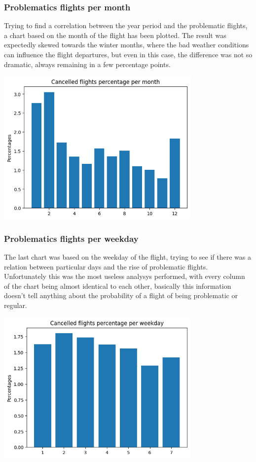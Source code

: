 \documentclass[
	letterpaper, %
	10pt, %
]{class}
\begin{document}
\subsubsection{Problematics flights per month}
Trying to find a correlation between the year period and the problematic flights, a chart based on the month of the flight has been plotted. The result was expectedly skewed towards the winter months, where the bad weather conditions can influence the flight departures, but even in this case, the difference was not so dramatic, always remaining in a few percentage points.

\begin{center}
    \includegraphics[width=10cm]{../images/cancelled_per_month.png}
\end{center}

\subsubsection{Problematics flights per weekday}

The last chart was based on the weekday of the flight, trying to see if there was a relation between particular days and the rise of problematic flights.\\

Unfortunately this was the most useless analysys performed, with every column of the chart being almost identical to each other, basically this information doesn't tell anything about the probability of a flight of being problematic or regular.

\begin{center}
    \includegraphics[width=10cm]{../images/cancelled_per_weekday.png}
\end{center}
\end{document}
